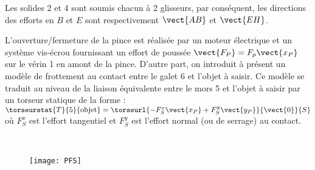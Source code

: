 
\ifprof
\begin{corrige}
Les solides 2 et 4 sont soumis chacun à 2 glisseurs, par conséquent, les directions des efforts  en $B$ et $E$ sont respectivement $\vect{AB}$ et $\vect{EH}$.
\end{corrige}
\else
\fi


L'ouverture/fermeture de la pince est réalisée par un moteur électrique et un système vis-écrou
fournissant un effort de poussée $\vect{F_P}=F_p\vect{x_P}$ sur le vérin 1 en amont de la pince. D'autre part, on
introduit à présent un modèle de frottement au contact entre le galet 6 et l'objet à saisir. Ce modèle
se traduit au niveau de la liaison équivalente entre le mors 5 et l'objet à saisir par un torseur
statique de la forme : $\torseurstat{T}{5}{\text{objet}}=\torseurl{-F_S^x\vect{x_P}+F_S^y\vect{y_P}}{\vect{0}}{S}$ 
où $F_S^x$ est l'effort tangentiel et $F_S^y$ est l'effort normal (ou de serrage) au contact.



\ifprof
\begin{corrige}~\\
\begin{figure}[H]
\centering
{\texttt{[image: PFS]}}
\end{figure}

\end{corrige}
\else
\fi


